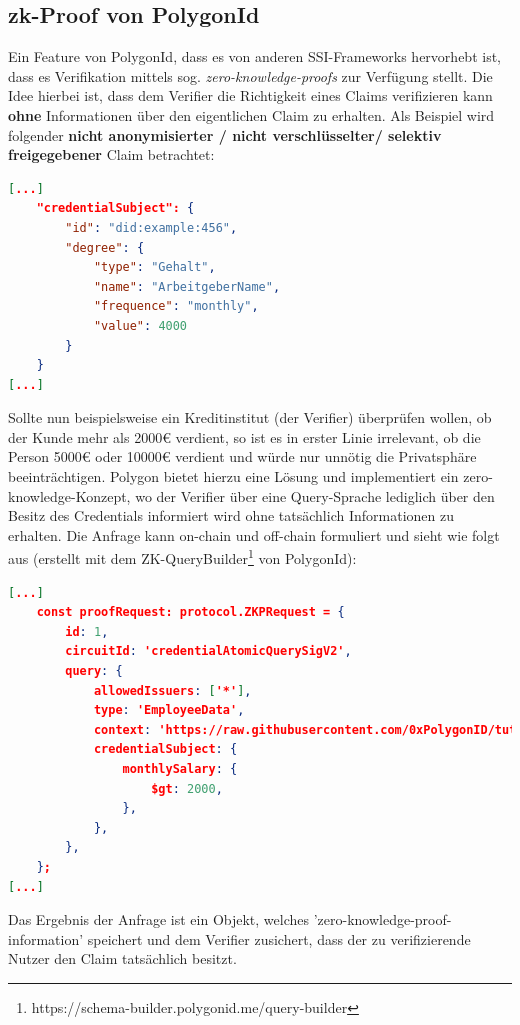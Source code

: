 \subsection{zk-Proof von PolygonId}
Ein Feature von PolygonId, dass es von anderen SSI-Frameworks hervorhebt ist, dass es Verifikation mittels sog. \textsl{zero-knowledge-proofs} zur Verfügung stellt. Die Idee hierbei ist, dass dem Verifier die Richtigkeit eines Claims verifizieren kann \textbf{ohne} Informationen über den eigentlichen Claim zu erhalten. Als Beispiel wird folgender \textbf{nicht anonymisierter / nicht verschlüsselter/ selektiv freigegebener} Claim betrachtet:
\begin{lstlisting}[language=json,firstnumber=1]	
[...]
	"credentialSubject": {	
		"id": "did:example:456",	
		"degree": {		
			"type": "Gehalt",		
			"name": "ArbeitgeberName",		
			"frequence": "monthly",
			"value": 4000	
		}	
	}
[...]
\end{lstlisting}
Sollte nun beispielsweise ein Kreditinstitut (der Verifier) überprüfen wollen, ob der Kunde mehr als 2000€ verdient, so ist es in erster Linie irrelevant, ob die Person 5000€ oder 10000€ verdient und würde nur unnötig die Privatsphäre beeinträchtigen. Polygon bietet hierzu eine Lösung und implementiert ein zero-knowledge-Konzept, wo der Verifier über eine Query-Sprache lediglich über den Besitz des Credentials informiert wird ohne tatsächlich Informationen zu erhalten.
Die Anfrage kann on-chain und off-chain formuliert und sieht wie folgt aus (erstellt mit dem ZK-QueryBuilder\footnote{https://schema-builder.polygonid.me/query-builder} von PolygonId):

\begin{lstlisting}[language=json,firstnumber=1]	
[...]
    const proofRequest: protocol.ZKPRequest = {
		id: 1,
		circuitId: 'credentialAtomicQuerySigV2',
		query: {
			allowedIssuers: ['*'],
			type: 'EmployeeData',
			context: 'https://raw.githubusercontent.com/0xPolygonID/tutorial-examples/main/credential-schema/schemas-examples/employee-data/employee-data.jsonld',
			credentialSubject: {
				monthlySalary: {
					$gt: 2000,
				},
			},
		},
	};
[...]
\end{lstlisting}
Das Ergebnis der Anfrage ist ein Objekt, welches 'zero-knowledge-proof-information' speichert und dem Verifier zusichert, dass der zu verifizierende Nutzer den Claim tatsächlich besitzt.

